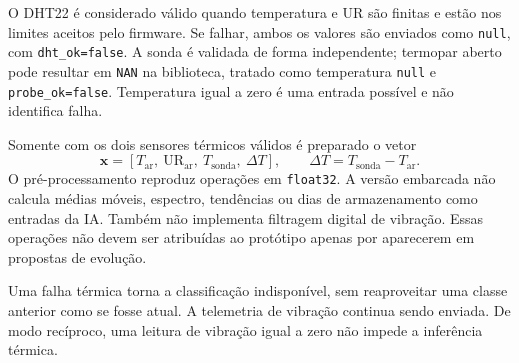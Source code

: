 O DHT22 é considerado válido quando temperatura e UR são finitas e estão
nos limites aceitos pelo firmware. Se falhar, ambos os valores são enviados
como \texttt{null}, com \texttt{dht\_ok=false}. A sonda é validada de forma
independente; termopar aberto pode resultar em \texttt{NAN} na biblioteca,
tratado como temperatura \texttt{null} e \texttt{probe\_ok=false}.
Temperatura igual a zero é uma entrada possível e não identifica falha.

Somente com os dois sensores térmicos válidos é preparado o vetor
\begin{equation}
\mathbf{x}=
\left[T_{\mathrm{ar}},\ \mathrm{UR}_{\mathrm{ar}},\
T_{\mathrm{sonda}},\ \Delta T\right],
\qquad
\Delta T=T_{\mathrm{sonda}}-T_{\mathrm{ar}}.
\label{eq:atributos}
\end{equation}
O pré-processamento reproduz operações em \texttt{float32}. A versão
embarcada não calcula médias móveis, espectro, tendências ou dias de
armazenamento como entradas da IA. Também não implementa filtragem
digital de vibração. Essas operações não devem ser atribuídas ao
protótipo apenas por aparecerem em propostas de evolução.

Uma falha térmica torna a classificação indisponível, sem reaproveitar
uma classe anterior como se fosse atual. A telemetria de vibração
continua sendo enviada. De modo recíproco, uma leitura de vibração
igual a zero não impede a inferência térmica.
\FloatBarrier
